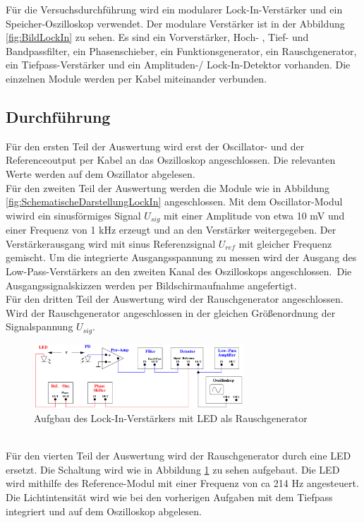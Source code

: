 Für die Versuchsdurchführung wird ein modularer Lock-In-Verstärker und ein Speicher-Oszilloskop verwendet.
Der modulare Verstärker ist in der Abbildung \ref{fig:BildLockIn} zu sehen. Es sind ein Vorverstärker, Hoch-
, Tief- und Bandpassfilter, ein Phasenschieber, ein Funktionsgenerator, ein Rauschgenerator, ein Tiefpass-Verstärker
und ein Amplituden-/ Lock-In-Detektor vorhanden. Die einzelnen Module werden per Kabel miteinander verbunden.

\subsection{Durchführung}
\label{sec:Durchführung}

Für den ersten Teil der Auswertung wird erst der Oscillator- und der Referenceoutput per Kabel an das Oszilloskop angeschlossen. 
Die relevanten Werte werden auf dem Oszillator abgelesen.\\
Für den zweiten Teil der Auswertung werden die Module wie in Abbildung \ref{fig:SchematischeDarstellungLockIn} angeschlossen.
Mit dem Oscillator-Modul wiwird ein sinusförmiges Signal $U_{sig}$ mit einer Amplitude von etwa 10 mV und einer Frequenz von 1 kHz erzeugt
und an den Verstärker weitergegeben. Der Verstärkerausgang wird mit sinus Referenzsignal $U_{ref}$ mit gleicher Frequenz gemischt.
Um die integrierte Ausgangsspannung zu messen wird der Ausgang des Low-Pass-Verstärkers an den zweiten Kanal des Oszilloskops angeschlossen.\
Die Ausgangssignalskizzen werden per Bildschirmaufnahme angefertigt.\\
Für den dritten Teil der Auswertung wird der Rauschgenerator angeschlossen. Wird der Rauschgenerator angeschlossen in der gleichen Größenordnung
der Signalspannung $U_{sig}$.\\
\begin{figure}
    \centering
    \includegraphics[width=0.7\textwidth]{img/LED.png}
    \caption{Aufgbau des Lock-In-Verstärkers mit LED als Rauschgenerator}
    \label{fig:LED}
\end{figure}
\\
Für den vierten Teil der Auswertung wird der Rauschgenerator durch eine LED ersetzt. Die Schaltung wird wie in Abbildung \ref{fig:LED} zu sehen aufgebaut.
Die LED wird mithilfe des Reference-Modul mit einer Frequenz von ca 214 Hz angesteuert.
Die Lichtintensität wird wie bei den vorherigen Aufgaben mit dem Tiefpass integriert und auf dem Oszilloskop abgelesen.
